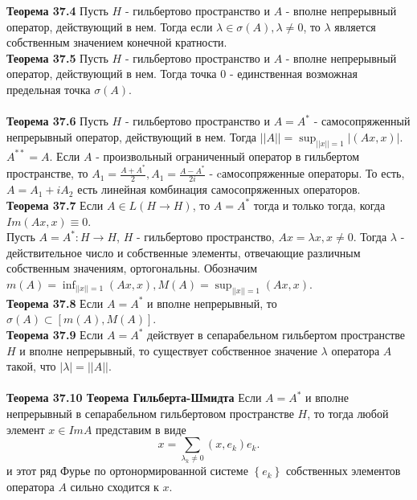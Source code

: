 \documentclass{article}
\begin{document}
	\textbf{Теорема 37.4} Пусть $H$ - гильбертово пространство и $A$ - вполне непрерывный оператор, действующий в нем. Тогда если $\lambda \in \sigma(A), \lambda \ne 0$, то $\lambda$ является собственным значением конечной кратности.\\
	\textbf{Теорема 37.5} Пусть $H$ - гильбертово пространство и $A$ - вполне непрерывный оператор, действующий в нем. Тогда точка 0 - единственная возможная предельная точка $\sigma(A)$.\\
	\\
	\textbf{Теорема 37.6} Пусть $H$ - гильбертово пространство и $A={A}^{*}$ - самосопряженный непрерывный оператор, действующий в нем. Тогда $||A||=\sup_{||x||=1} |(Ax,x)|$.\\
	${A}^{**}=A$. Если $A$ - произвольный ограниченный оператор в гильбертом пространстве, то ${A}_{1}=\frac{A+{A}^{*}}{2},{A}_{1}=\frac{A-{A}^{*}}{2i}$ - cамосопряженные операторы. То есть, $A={A}_{1}+i{A}_{2}$ есть линейная комбинация самосопряженных операторов.\\
	\textbf{Теорема 37.7} Если $A\in L(H\rightarrow H)$, то $A={A}^{*}$ тогда и только тогда, когда $Im(Ax,x)\equiv 0$.\\
	Пусть $A={A}^{*}:H\rightarrow H$, $H$ - гильбертово пространство, $Ax=\lambda x,x\ne 0$. Тогда $\lambda$ - действительное число и собственные элементы, отвечающие различным собственным значениям, ортогональны. Обозначим $m(A)=\inf_{||x||=1} (Ax,x), M(A)=\sup_{||x||=1} (Ax,x)$.\\
	\textbf{Теорема 37.8} Если $A={A}^{*}$ и вполне непрерывный, то $\sigma(A)\subset [m(A),M(A)]$.\\
	\textbf{Теорема 37.9} Если $A={A}^{*}$ действует в сепарабельном гильбертом пространстве $H$ и вполне непрерывный, то существует собственное значение $\lambda$ оператора $A$ такой, что $|\lambda|=||A||$.\\
	\\
	\textbf{Теорема 37.10 Теорема Гильберта-Шмидта} Если $A={A}^{*}$ и вполне непрерывный в сепарабельном гильбертовом пространстве $H$, то тогда любой элемент $x\in ImA$ представим в виде
	\begin{equation}
	x=\sum_{\lambda_{k} \neq 0}(x,e_{k})e_{k}.
	\end{equation}
	и этот ряд Фурье по ортонормированной системе $\left\{e_{k}\right\}$  собственных элементов оператора $A$ сильно сходится к $x$.\\ 
	
\end{document}
